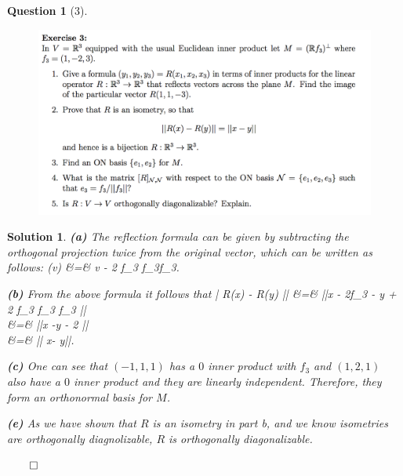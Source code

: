 \documentclass{article} %
\def\eQb#1\eQe{\begin{eqnarray*}#1\end{eqnarray*}}
\theoremstyle{quest}
\newtheorem*{question}{Question}
\newtheorem*{solution}{Solution}
\begin{document}
\begin{question}[3]
\hfill
\begin{figure}[h!]
  \centering
    \includegraphics[width=1\textwidth]{LA-4-3.png}
\end{figure}
\end{question}
\begin{solution}
\textbf{(a)}
The reflection formula can be given by subtracting the orthogonal projection twice from
the original vector, which can be written as follows:
\eQb
R(v) &=& v - 2 {f_3 \cdot f_3}f_3.
\eQe

\smallskip

\textbf{(b)} From the above formula it follows that
\eQb
|| R(x) - R(y) || &=& ||x - 2f_3 - y + 2
{f_3 \cdot f_3} f_3 || \\
&=& ||x -y - 2 || \\
&=& || x- y||.
\eQe 

\smallskip

\textbf{(c)}
One can see that $(-1,1,1)$ has a $0$ inner product with $f_3$ and $(1,2,1)$ also have a $0$ inner
product and they are linearly independent. Therefore, they form an orthonormal basis for $M$.

\textbf{(e)}
As we have shown that $R$ is an isometry in part b, and we know isometries are orthogonally diagnolizable,
$R$ is orthogonally diagonalizable. 

\hfill $\qed$

\end{solution}

\newpage
\end{document}
